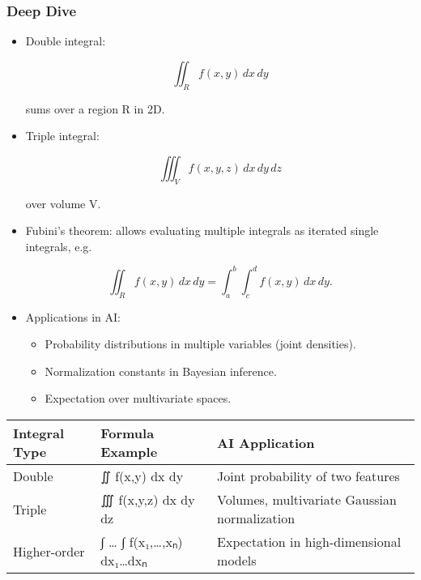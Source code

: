 \documentclass[
  letterpaper,
  DIV=11,
  numbers=noendperiod]{scrreprt}
\providecommand{\tightlist}{%
  \setlength{\itemsep}{0pt}\setlength{\parskip}{0pt}}
\begin{document}
\subsubsection{Deep Dive}\label{deep-dive-117}

\begin{itemize}
\item
  Double integral:

  \[
  \iint_R f(x,y)\,dx\,dy
  \]

  sums over a region R in 2D.
\item
  Triple integral:

  \[
  \iiint_V f(x,y,z)\,dx\,dy\,dz
  \]

  over volume V.
\item
  Fubini's theorem: allows evaluating multiple integrals as iterated
  single integrals, e.g.

  \[
  \iint_R f(x,y)\,dx\,dy = \int_a^b \int_c^d f(x,y)\,dx\,dy.
  \]
\item
  Applications in AI:

  \begin{itemize}
  \tightlist
  \item
    Probability distributions in multiple variables (joint densities).
  \item
    Normalization constants in Bayesian inference.
  \item
    Expectation over multivariate spaces.
  \end{itemize}
\end{itemize}

\begin{longtable}[]{@{}
  >{\raggedright\arraybackslash}p{}
  >{\raggedright\arraybackslash}p{}
  >{\raggedright\arraybackslash}p{}@{}}
\toprule\noalign{}
\begin{minipage}[b]{\linewidth}\raggedright
Integral Type
\end{minipage} & \begin{minipage}[b]{\linewidth}\raggedright
Formula Example
\end{minipage} & \begin{minipage}[b]{\linewidth}\raggedright
AI Application
\end{minipage} \\
\midrule\noalign{}
\endhead
\bottomrule\noalign{}
\endlastfoot
Double & ∬ f(x,y) dx dy & Joint probability of two features \\
Triple & ∭ f(x,y,z) dx dy dz & Volumes, multivariate Gaussian
normalization \\
Higher-order & ∫ \ldots{} ∫ f(x₁,\ldots,xₙ) dx₁\ldots dxₙ & Expectation
in high-dimensional models \\
\end{longtable}
\end{document}
